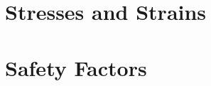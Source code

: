 \documentclass{article} %
\begin{document}
\renewcommand{\arraystretch}{1.2}
\appendix
\thispagestyle{empty}
\section{Stresses and Strains}

\newpage
\section{Safety Factors}

\end{document}

